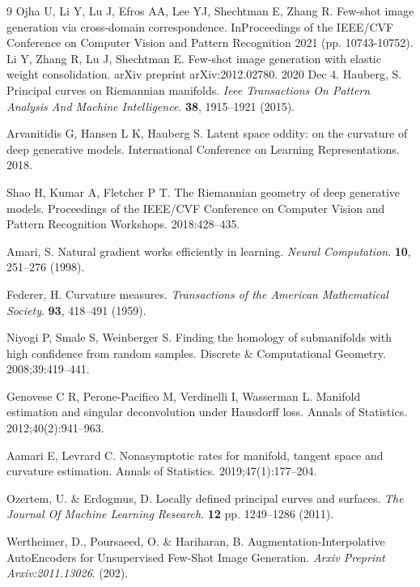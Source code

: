 \documentclass[preprint,12pt,number]{elsarticle}
\begin{document}
\newpage
\begin{thebibliography}{9}
Ojha U, Li Y, Lu J, Efros AA, Lee YJ, Shechtman E, Zhang R. Few-shot image generation via cross-domain correspondence. InProceedings of the IEEE/CVF Conference on Computer Vision and Pattern Recognition 2021 (pp. 10743-10752).
Li Y, Zhang R, Lu J, Shechtman E. Few-shot image generation with elastic weight consolidation. arXiv preprint arXiv:2012.02780. 2020 Dec 4.
Hauberg, S. Principal curves on Riemannian manifolds. 
{\em Ieee Transactions On Pattern Analysis And Machine Intelligence}.
 \textbf{38}, 1915--1921 (2015).

Arvanitidis G, Hansen L K, Hauberg S. Latent space oddity: on the curvature of deep generative models. International Conference on Learning Representations. 2018.

Shao H, Kumar A, Fletcher P T. The Riemannian geometry of deep generative models. Proceedings of the IEEE/CVF Conference on Computer Vision and Pattern Recognition Workshops. 2018:428--435.

Amari, S. Natural gradient works efficiently in learning.
{\em Neural Computation}.
\textbf{10}, 251--276 (1998).

Federer, H. Curvature measures.
{\em Transactions of the American Mathematical Society}.
\textbf{93}, 418--491 (1959).

Niyogi P, Smale S, Weinberger S. Finding the homology of submanifolds with high confidence from random samples. Discrete \& Computational Geometry. 2008;39:419--441.

Genovese C R, Perone-Pacifico M, Verdinelli I, Wasserman L. Manifold estimation and singular deconvolution under Hausdorff loss. Annals of Statistics. 2012;40(2):941--963.

Aamari E, Levrard C. Nonasymptotic rates for manifold, tangent space and curvature estimation. Annals of Statistics. 2019;47(1):177--204.

Ozertem, U. \& Erdogmus, D. Locally defined principal curves and surfaces. 
{\em The Journal Of Machine Learning Research}.
 \textbf{12} pp. 1249--1286 (2011).

Wertheimer, D., Poursaeed, O. \& Hariharan, B. Augmentation-Interpolative AutoEncoders for Unsupervised Few-Shot Image Generation. 
{\em Arxiv Preprint Arxiv:2011.13026}.
 (202).
 

\end{thebibliography}
\end{document}
